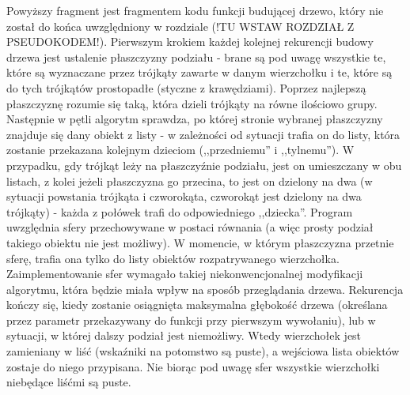 Powyższy fragment jest fragmentem kodu funkcji budującej drzewo, który nie został do końca uwzględniony w rozdziale (!TU WSTAW ROZDZIAŁ Z PSEUDOKODEM!). Pierwszym krokiem każdej kolejnej rekurencji budowy drzewa jest ustalenie płaszczyzny podziału - brane są pod uwagę wszystkie te, które są wyznaczane przez trójkąty zawarte w danym wierzchołku i te, które są do tych trójkątów prostopadłe (styczne z krawędziami). Poprzez najlepszą płaszczyznę rozumie się taką, która dzieli trójkąty na równe ilościowo grupy. Następnie w pętli algorytm sprawdza, po której stronie wybranej płaszczyzny znajduje się dany obiekt z listy - w zależności od sytuacji trafia on do listy, która zostanie przekazana kolejnym dzieciom (,,przedniemu'' i ,,tylnemu''). W przypadku, gdy trójkąt leży na płaszczyźnie podziału, jest on umieszczany w obu listach, z kolei jeżeli płaszczyzna go przecina, to jest on dzielony na dwa (w sytuacji powstania trójkąta i czworokąta, czworokąt jest dzielony na dwa trójkąty) - każda z połówek trafi do odpowiedniego ,,dziecka''. 	Program uwzględnia sfery przechowywane w postaci równania (a więc prosty podział takiego obiektu nie jest możliwy). W momencie, w którym płaszczyzna przetnie sferę, trafia ona tylko do listy obiektów rozpatrywanego wierzchołka. Zaimplementowanie sfer wymagało takiej niekonwencjonalnej modyfikacji algorytmu, która będzie miała wpływ na sposób przeglądania drzewa. Rekurencja kończy się, kiedy zostanie osiągnięta maksymalna głębokość drzewa (określana przez parametr przekazywany do funkcji przy pierwszym wywołaniu), lub w sytuacji, w której dalszy podział jest niemożliwy. Wtedy wierzchołek jest zamieniany w liść (wskaźniki na potomstwo są puste), a wejściowa lista obiektów zostaje do niego przypisana. Nie biorąc pod uwagę sfer wszystkie wierzchołki niebędące liśćmi są puste.

